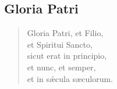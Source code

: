 \subsection*{Gloria Patri}
\vspace{-0.5em}

\begin{verse}
        Gloria Patri, et Filio,
\\\vin      et Spiritui Sancto,
\\      sicut erat in principio,
\\\vin      et nunc, et semper,
\\\vin      et in s\'{æ}cula sæculorum.
\end{verse}